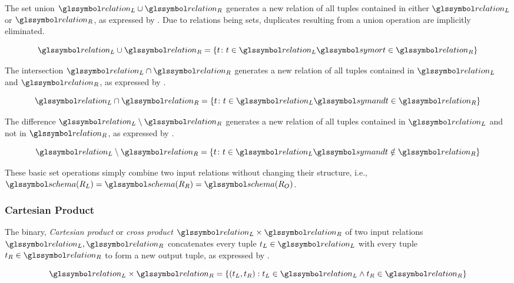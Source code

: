 The set union $\relation_L \cup \relation_R$ generates a new relation of all tuples contained in either $\relation_L$ or $\relation_R$, as expressed by . Due to relations being sets, duplicates resulting from a union operation are implicitly eliminated.

\begin{equation}
    \label{equation:rel_op_union}
    \relation_L \cup \relation_R = \{ t \colon t \in \relation_L \symor t \in \relation_R \}
\end{equation}

The intersection $\relation_L \cap \relation_R$ generates a new relation of all tuples contained in $\relation_L$ and $\relation_R$, as expressed by .

\begin{equation}
    \label{equation:rel_op_intersection}
    \relation_L \cap \relation_R = \{ t \colon t \in \relation_L \symand t \in \relation_R \}
\end{equation}

The difference $\relation_L \setminus \relation_R$ generates a new relation of all tuples contained in $\relation_L$ and not in $\relation_R$, as expressed by .

\begin{equation}
    \label{equation:rel_op_difference}
    \relation_L \setminus \relation_R = \{ t \colon t \in \relation_L \symand t \notin \relation_R \}
\end{equation}

These basic set operations simply combine two input relations without changing their structure, i.e., $\schema(R_{L}) = \schema(R_{R}) = \schema(R_{O})$. 

\subsubsection{Cartesian Product}
The binary, \emph{Cartesian product} or \emph{cross product} $\relation_L \times \relation_R$ of two input relations $\relation_L,\relation_R$ concatenates every tuple $t_{L} \in \relation_L$ with every tuple $t_{R} \in \relation_R$ to form a new output tuple, as expressed by .

\begin{equation}
    \label{equation:rel_op_cartesian}
    \relation_L \times \relation_R = \{ (t_L, t_R) : t_L \in \relation_L \wedge t_R \in \relation_R \}
\end{equation}

